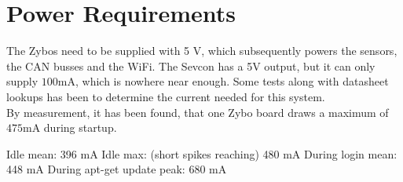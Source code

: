 
\section{Power Requirements}\label{sec:power_requirements}
The Zybos need to be supplied with 5 V, which subsequently powers the sensors, the CAN busses and the WiFi.
The Sevcon has a 5V output, but it can only supply $\si{100 \milli \ampere}$, which is nowhere near enough.
Some tests along with datasheet lookups has been to determine the current needed for this system.\\

By measurement, it has been found, that one Zybo board draws a maximum of $\si{475 \milli \ampere}$ during startup. 

Idle mean: 396 mA
Idle max: (short spikes reaching) 480 mA
During login mean: 448 mA
During apt-get update peak: 680 mA
